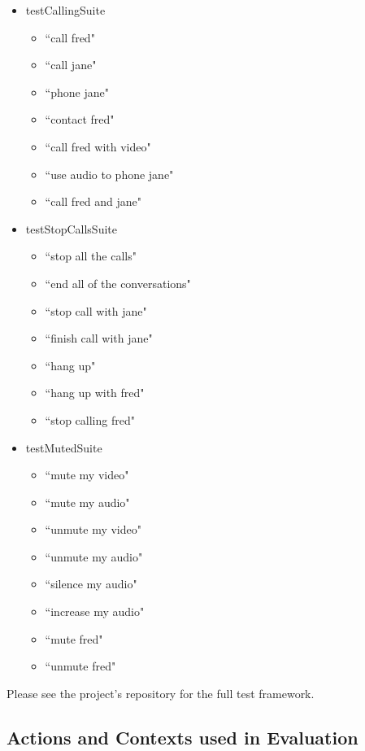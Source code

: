 \documentclass[11pt]{article}
\begin{document}
\begin{appendices}
\begin{scriptsize}
\begin{itemize}
\item testCallingSuite
	\begin{itemize}
	\item ``call fred"
	\item ``call jane"
	\item ``phone jane"
	\item ``contact fred"
	\item ``call fred with video"
	\item ``use audio to phone jane"
	\item ``call fred and jane"
	\end{itemize}
\item testStopCallsSuite
	\begin{itemize}
	\item ``stop all the calls"
	\item ``end all of the conversations"
	\item ``stop call with jane"
	\item ``finish call with jane"
	\item ``hang up"
	\item ``hang up with fred"
	\item ``stop calling fred"
	\end{itemize}
\item testMutedSuite
	\begin{itemize}
	\item ``mute my video"
	\item ``mute my audio"
	\item ``unmute my video"
	\item ``unmute my audio"
	\item ``silence my audio"
	\item ``increase my audio"
	\item ``mute fred"
	\item ``unmute fred"
	\end{itemize}	
\end{itemize}
\end{scriptsize}

Please see the project's repository for the full test framework.

\newpage
\subsection{Actions and Contexts used in Evaluation}
\label{appendix:evaluation-context-action-maps}


\end{appendices}
\end{document}
